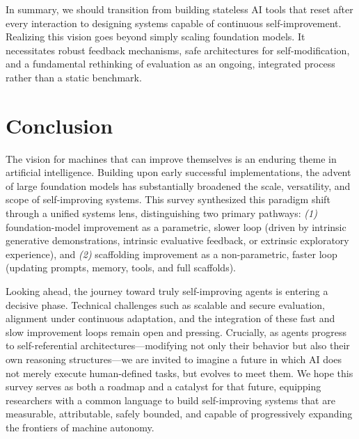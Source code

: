 \vspace{0.35em}
\noindent
In summary, we should transition from building stateless AI tools that reset after every interaction to designing systems capable of continuous self-improvement. Realizing this vision goes beyond simply scaling foundation models. It necessitates robust feedback mechanisms, safe architectures for self-modification, and a fundamental rethinking of evaluation as an ongoing, integrated process rather than a static benchmark.


\section{Conclusion}
\label{sec:Conclusion}

The vision for machines that can improve themselves is an enduring theme in artificial intelligence. Building upon early successful implementations, the advent of large foundation models has substantially broadened the scale, versatility, and scope of self-improving systems. This survey synthesized this paradigm shift through a unified systems lens, distinguishing two primary pathways: \textit{(1)} foundation-model improvement as a parametric, slower loop (driven by intrinsic generative demonstrations, intrinsic evaluative feedback, or extrinsic exploratory experience), and \textit{(2)} scaffolding improvement as a non-parametric, faster loop (updating prompts, memory, tools, and full scaffolds).

Looking ahead, the journey toward truly self-improving agents is entering a decisive phase. Technical challenges such as scalable and secure evaluation, alignment under continuous adaptation, and the integration of these fast and slow improvement loops remain open and pressing. Crucially, as agents progress to self-referential architectures—modifying not only their behavior but also their own reasoning structures—we are invited to imagine a future in which AI does not merely execute human-defined tasks, but evolves to meet them. We hope this survey serves as both a roadmap and a catalyst for that future, equipping researchers with a common language to build self-improving systems that are measurable, attributable, safely bounded, and capable of progressively expanding the frontiers of machine autonomy.
